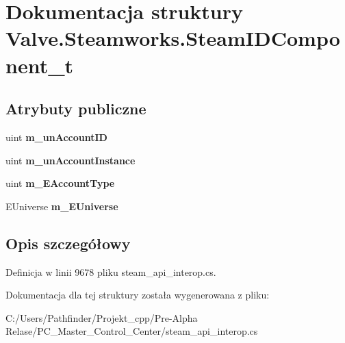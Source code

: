 \hypertarget{struct_valve_1_1_steamworks_1_1_steam_i_d_component__t}{}\section{Dokumentacja struktury Valve.\+Steamworks.\+Steam\+I\+D\+Component\+\_\+t}
\label{struct_valve_1_1_steamworks_1_1_steam_i_d_component__t}
\subsection*{Atrybuty publiczne}
\begin{DoxyCompactItemize}
\item 
\mbox{\label{struct_valve_1_1_steamworks_1_1_steam_i_d_component__t_a0fa9c6a4e6da1e7f071d05aba16d439b}} 
uint {\bfseries m\+\_\+un\+Account\+ID}
\item 
\mbox{\label{struct_valve_1_1_steamworks_1_1_steam_i_d_component__t_a5fb146cbc9fbfd951dd06450ab8891c9}} 
uint {\bfseries m\+\_\+un\+Account\+Instance}
\item 
\mbox{\label{struct_valve_1_1_steamworks_1_1_steam_i_d_component__t_ad58da28a34031d0beebf0472abb72a69}} 
uint {\bfseries m\+\_\+\+E\+Account\+Type}
\item 
\mbox{\label{struct_valve_1_1_steamworks_1_1_steam_i_d_component__t_a62c7e4e0b219a8068beaf15f88c1865d}} 
E\+Universe {\bfseries m\+\_\+\+E\+Universe}
\end{DoxyCompactItemize}


\subsection{Opis szczegółowy}


Definicja w linii 9678 pliku steam\+\_\+api\+\_\+interop.\+cs.



Dokumentacja dla tej struktury została wygenerowana z pliku\+:\begin{DoxyCompactItemize}
\item 
C\+:/\+Users/\+Pathfinder/\+Projekt\+\_\+cpp/\+Pre-\/\+Alpha Relase/\+P\+C\+\_\+\+Master\+\_\+\+Control\+\_\+\+Center/steam\+\_\+api\+\_\+interop.\+cs\end{DoxyCompactItemize}
